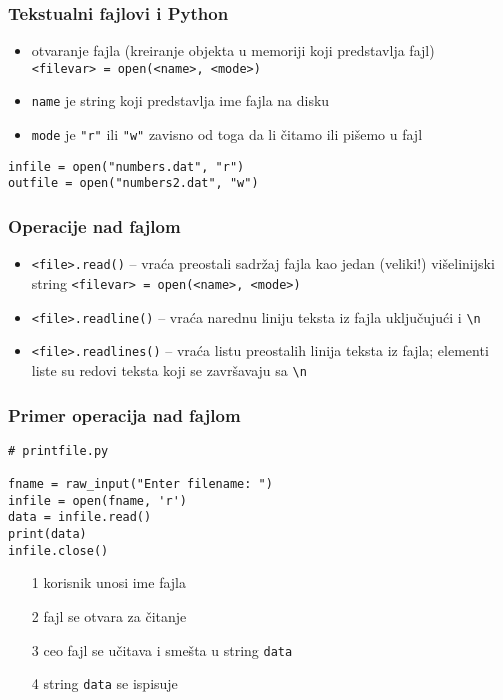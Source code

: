 \documentclass[utf8,compress]{beamer}
\begin{document}
\begin{frame}[fragile]
  \frametitle{Tekstualni fajlovi i Python}
  \begin{itemize}
    \item otvaranje fajla (kreiranje objekta u memoriji koji predstavlja fajl) \\
      \texttt{<filevar> = open(<name>, <mode>)}
    \item \texttt{name} je string koji predstavlja ime fajla na disku
    \item \texttt{mode} je \texttt{"r"} ili \texttt{"w"} zavisno od toga da li čitamo ili pišemo u fajl
  \end{itemize}
\begin{verbatim}
infile = open("numbers.dat", "r")
outfile = open("numbers2.dat", "w")
\end{verbatim}
\end{frame}

\begin{frame}[fragile]
  \frametitle{Operacije nad fajlom}
  \begin{itemize}
    \item \texttt{<file>.read()} -- vraća preostali sadržaj fajla kao jedan (veliki!) višelinijski string
      \texttt{<filevar> = open(<name>, <mode>)}
    \item \texttt{<file>.readline()} -- vraća narednu liniju teksta iz fajla uključujući i \texttt{\textbackslash n}
    \item \texttt{<file>.readlines()} -- vraća listu preostalih linija teksta iz fajla; elementi liste su redovi teksta koji se završavaju sa \texttt{\textbackslash n}
  \end{itemize}
\end{frame}

\begin{frame}[fragile]
  \frametitle{Primer operacija nad fajlom}
\begin{verbatim}
# printfile.py

fname = raw_input("Enter filename: ")
infile = open(fname, 'r')
data = infile.read()
print(data)
infile.close()
\end{verbatim}
  \begin{itemize}
    \item[1] korisnik unosi ime fajla
    \item[2] fajl se otvara za čitanje
    \item[3] ceo fajl se učitava i smešta u string \texttt{data}
    \item[4] string \texttt{data} se ispisuje
  \end{itemize}
\end{frame}
\end{document}
